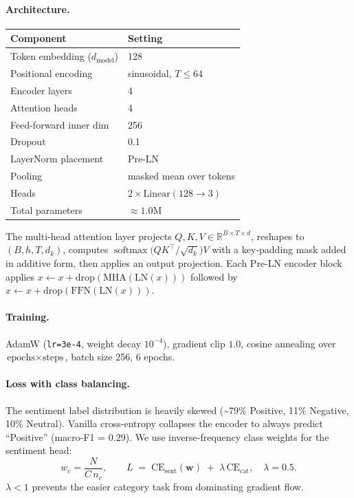 \documentclass[11pt,a4paper]{article}
\begin{document}
\paragraph{Architecture.}
\begin{center}
\small
\begin{tabular}{ll}
\toprule
Component & Setting \\
\midrule
Token embedding ($d_{\text{model}}$)   & 128 \\
Positional encoding                    & sinusoidal, $T\le 64$ \\
Encoder layers                         & 4 \\
Attention heads                        & 4 \\
Feed-forward inner dim                 & 256 \\
Dropout                                & 0.1 \\
LayerNorm placement                    & Pre-LN \\
Pooling                                & masked mean over tokens \\
Heads                                  & $2 \times \text{Linear}(128 \to 3)$ \\
Total parameters                       & $\approx 1.0$M \\
\bottomrule
\end{tabular}
\end{center}

The multi-head attention layer projects $Q, K, V \in \mathbb{R}^{B\times T\times d}$,
reshapes to $(B, h, T, d_k)$, computes
$\operatorname{softmax}\bigl(QK^\top/\sqrt{d_k}\bigr)V$ with a key-padding
mask added in additive form, then applies an output projection. Each Pre-LN
encoder block applies
$x \leftarrow x + \mathrm{drop}(\mathrm{MHA}(\mathrm{LN}(x)))$
followed by
$x \leftarrow x + \mathrm{drop}(\mathrm{FFN}(\mathrm{LN}(x)))$.

\paragraph{Training.}
AdamW (\texttt{lr=3e-4}, weight decay $10^{-4}$), gradient clip $1.0$,
cosine annealing over $\text{epochs}\times\text{steps}$, batch size 256,
6 epochs.

\paragraph{Loss with class balancing.}
The sentiment label distribution is heavily skewed
(\textasciitilde79\% Positive, 11\% Negative, 10\% Neutral). Vanilla
cross-entropy collapses the encoder to always predict ``Positive''
(macro-F1 = $0.29$). We use inverse-frequency class weights for the
sentiment head:
\[
  w_c = \frac{N}{C\,n_c},\qquad
  L \;=\; \mathrm{CE}_{\text{sent}}(\mathbf{w})\;+\;\lambda\,\mathrm{CE}_{\text{cat}},
  \quad \lambda = 0.5.
\]
$\lambda < 1$ prevents the easier category task from dominating gradient
flow.
\end{document}
